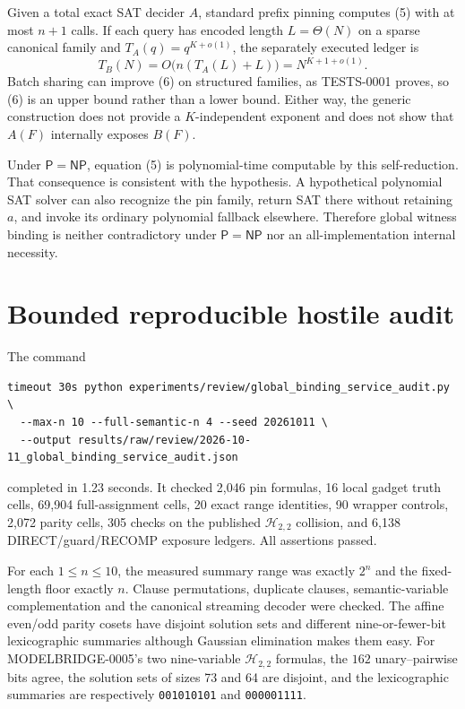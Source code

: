 \documentclass[11pt]{article}
\newcommand{\Pclass}{\mathsf P}
\newcommand{\NPclass}{\mathsf{NP}}
\begin{document}
Given a total exact SAT decider $A$, standard prefix pinning computes (5)
with at most $n+1$ calls.  If each query has encoded length $L=\Theta(N)$ on
a sparse canonical family and $T_A(q)=q^{K+o(1)}$, the separately executed
ledger is
\[
T_B(N)=O\bigl(n(T_A(L)+L)\bigr)=N^{K+1+o(1)}.                             \tag{6}
\]
Batch sharing can improve (6) on structured families, as TESTS-0001 proves,
so (6) is an upper bound rather than a lower bound.  Either way, the generic
construction does not provide a $K$-independent exponent and does not show
that $A(F)$ internally exposes $B(F)$.

Under $\Pclass=\NPclass$, equation (5) is polynomial-time computable by this
self-reduction.  That consequence is consistent with the hypothesis.  A
hypothetical polynomial SAT solver can also recognize the pin family, return
SAT there without retaining $a$, and invoke its ordinary polynomial fallback
elsewhere.  Therefore global witness binding is neither contradictory under
$\Pclass=\NPclass$ nor an all-implementation internal necessity.

\section{Bounded reproducible hostile audit}
The command
\begin{verbatim}
timeout 30s python experiments/review/global_binding_service_audit.py \
  --max-n 10 --full-semantic-n 4 --seed 20261011 \
  --output results/raw/review/2026-10-11_global_binding_service_audit.json
\end{verbatim}
completed in 1.23 seconds.  It checked 2,046 pin formulas, 16 local gadget
truth cells, 69,904 full-assignment cells, 20 exact range identities, 90
wrapper controls, 2,072 parity cells, 305 checks on the published
$\mathcal H_{2,2}$ collision, and 6,138 DIRECT/guard/RECOMP exposure ledgers.
All assertions passed.

For each $1\le n\le10$, the measured summary range was exactly $2^n$ and
the fixed-length floor exactly $n$.  Clause permutations, duplicate clauses,
semantic-variable complementation and the canonical streaming decoder were
checked.  The affine even/odd parity cosets have disjoint solution sets and
different nine-or-fewer-bit lexicographic summaries although Gaussian
elimination makes them easy.  For MODELBRIDGE-0005's two nine-variable
$\mathcal H_{2,2}$ formulas, the $162$ unary--pairwise bits agree, the
solution sets of sizes 73 and 64 are disjoint, and the lexicographic summaries
are respectively \texttt{001010101} and \texttt{000001111}.
\end{document}
